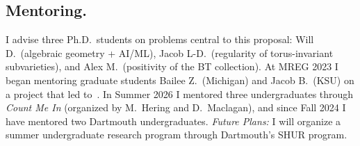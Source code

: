 \documentclass[11pt,reqno]{amsart}
\theoremstyle{remark}
\begin{document}
\subsection{Mentoring.} I advise three Ph.D.\ students on problems central to this proposal: Will D.\ (algebraic geometry + AI/ML), Jacob L-D.\ (regularity of torus-invariant subvarieties), and Alex M.\ (positivity of the BT collection). At MREG 2023 I began mentoring graduate students Bailee Z.\ (Michigan) and Jacob B.\ (KSU) on a project that led to~\cite{BBZ26}. In Summer 2026 I mentored three undergraduates through \textit{Count Me In} (organized by M.~Hering and D.~Maclagan), and since Fall 2024 I have mentored two Dartmouth undergraduates. \emph{Future Plans:} I will organize a summer undergraduate research program through Dartmouth's SHUR program.

%
%
\end{document}
